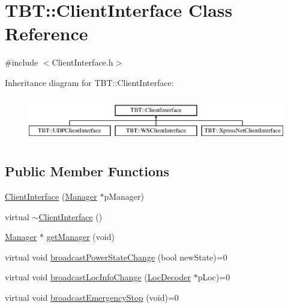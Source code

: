 \hypertarget{classTBT_1_1ClientInterface}{}\section{T\+BT\+:\+:Client\+Interface Class Reference}
\label{classTBT_1_1ClientInterface}


{\ttfamily \#include $<$Client\+Interface.\+h$>$}

Inheritance diagram for T\+BT\+:\+:Client\+Interface\+:\begin{figure}[H]
\begin{center}
\leavevmode
\includegraphics[height=1.975309cm]{classTBT_1_1ClientInterface}
\end{center}
\end{figure}
\subsection*{Public Member Functions}
\begin{DoxyCompactItemize}
\item 
\hyperlink{classTBT_1_1ClientInterface_a77cd35b080e78932f2371ea0f897964b_a77cd35b080e78932f2371ea0f897964b}{Client\+Interface} (\hyperlink{classTBT_1_1Manager}{Manager} $\ast$p\+Manager)
\item 
virtual \hyperlink{classTBT_1_1ClientInterface_aa42abb5947fa0af75eed777325cbff27_aa42abb5947fa0af75eed777325cbff27}{$\sim$\+Client\+Interface} ()
\item 
\hyperlink{classTBT_1_1Manager}{Manager} $\ast$ \hyperlink{classTBT_1_1ClientInterface_a26e144856b1253744b20c5638065acf7_a26e144856b1253744b20c5638065acf7}{get\+Manager} (void)
\item 
virtual void \hyperlink{classTBT_1_1ClientInterface_a7888a3446fb416fad75e5e008a85ca0c_a7888a3446fb416fad75e5e008a85ca0c}{broadcast\+Power\+State\+Change} (bool new\+State)=0
\item 
virtual void \hyperlink{classTBT_1_1ClientInterface_aaede3709fa0dcb23743f43d9c1a5ab04_aaede3709fa0dcb23743f43d9c1a5ab04}{broadcast\+Loc\+Info\+Change} (\hyperlink{classTBT_1_1LocDecoder}{Loc\+Decoder} $\ast$p\+Loc)=0
\item 
virtual void \hyperlink{classTBT_1_1ClientInterface_a8d19220baccb47a7c9f45d0288bebcb8_a8d19220baccb47a7c9f45d0288bebcb8}{broadcast\+Emergency\+Stop} (void)=0
\end{DoxyCompactItemize}
